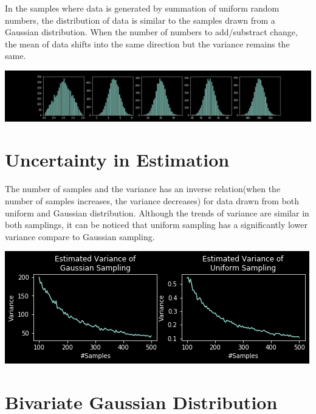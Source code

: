 \documentclass{article}
\begin{document}
In the samples where data is generated by summation of uniform random numbers, the distribution of data is similar to the samples drawn from a Gaussian distribution. When the number of numbers to add/substract change, the mean of data shifts into the same direction but the variance remains the same.
\begin{center}
\includegraphics[scale=0.4]{sum_random_numbers}
\end{center}

\maketitle
\section{Uncertainty in Estimation}
The number of samples and the variance has an inverse relation(when the number of samples increases, the variance decreases) for data drawn from both uniform and Gaussian distribution. Although the trends of variance are similar in both samplings, it can be noticed that uniform sampling has a significantly lower variance compare to Gaussian sampling.
\begin{center}
\includegraphics[scale=0.5]{estmd_variance}
\end{center}


\maketitle
\section{Bivariate Gaussian Distribution}

\maketitle
\end{document}
